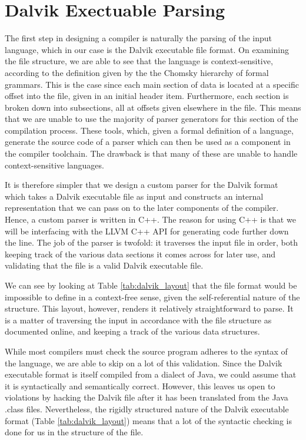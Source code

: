 \section{Dalvik Exectuable Parsing}
\label{sec:parsing}

The first step in designing a compiler is naturally the parsing of the input language, which in our case is the Dalvik executable file format. On examining the file structure, we are able to see that the language is context-sensitive, according to the definition given by the the Chomsky hierarchy of formal grammars. This is the case since each main section of data is located at a specific offset into the file, given in an initial header item. Furthermore, each section is broken down into subsections, all at offsets given elsewhere in the file. This means that we are unable to use the majority of parser generators for this section of the compilation process. These tools, which, given a formal definition of a language, generate the source code of a parser which can then be used as a component in the compiler toolchain. The drawback is that many of these are unable to handle context-sensitive languages.


It is therefore simpler that we design a custom parser for the Dalvik format which takes a Dalvik executable file as input and constructs an internal representation that we can pass on to the later components of the compiler. Hence, a custom parser is written in C++. The reason for using C++ is that we will be interfacing with the LLVM C++ API for generating code further down the line. The job of the parser is twofold: it traverses the input file in order, both keeping track of the various data sections it comes across for later use, and validating that the file is a valid Dalvik executable file.

We can see by looking at Table \ref{tab:dalvik_layout} that the file format would be impossible to define in a context-free sense, given the self-referential nature of the structure. This layout, however, renders it relatively straightforward to parse. It is a matter of traversing the input in accordance with the file structure as documented online\footnotemark {}, and keeping a track of the various data structures.

While most compilers must check the source program adheres to the syntax of the language, we are able to skip on a lot of this validation. Since the Dalvik executable format is itself compiled from a dialect of Java, we could assume that it is syntactically and semantically correct. However, this leaves us open to violations by hacking the Dalvik file after it has been translated from the Java .class files. Nevertheless, the rigidly structured nature of the Dalvik executable format (Table \ref{tab:dalvik_layout}) means that a lot of the syntactic checking is done for us in the structure of the file.

